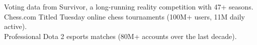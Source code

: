 \documentclass[preview]{standalone}
\begin{document}
Voting data from Survivor, a long-running reality competition with 47+ seasons.\\Chess.com Titled Tuesday online chess tournaments (100M+ users, 11M daily active).\\Professional Dota 2 esports matches (80M+ accounts over the last decade).\\
\end{document}
